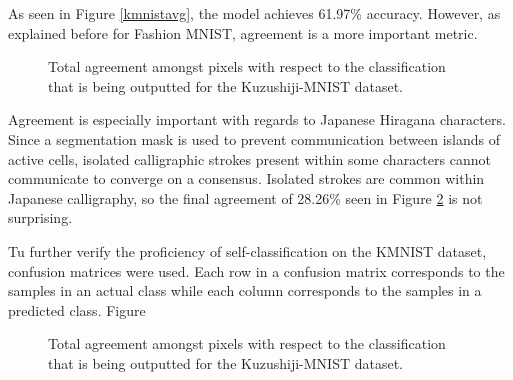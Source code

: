 \documentclass[conference]{IEEEtran}
\begin{document}
As seen in Figure \ref{kmnistavg}, the model achieves 61.97\% accuracy. However, as explained before for Fashion MNIST, agreement is a more important metric.

\begin{figure}[htbp]
\caption{ Total agreement amongst pixels with respect to the classification that is being outputted for the Kuzushiji-MNIST dataset.}
\label{kmnistagree}
\end{figure}

Agreement is especially important with regards to Japanese Hiragana characters. Since a segmentation mask is used to prevent communication between islands of active cells, isolated calligraphic strokes present within some characters cannot communicate to converge on a consensus. Isolated strokes are common within Japanese calligraphy, so the final agreement of 28.26\% seen in Figure \ref{kmnistagree} is not surprising. 

Tu further verify the proficiency of self-classification on the KMNIST dataset, confusion matrices were used. Each row in a confusion matrix corresponds to the samples in an actual class while each column corresponds to the samples in a predicted class. Figure 

\begin{figure}[htbp]
\caption{ Total agreement amongst pixels with respect to the classification that is being outputted for the Kuzushiji-MNIST dataset.}
\label{kmnistagree}
\end{figure}
\end{document}
